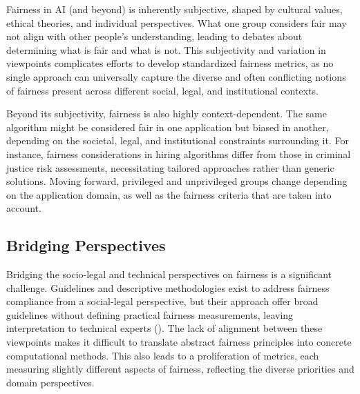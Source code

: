 \documentclass[12pt,a4paper,openright,twoside]{book}
\begin{document}


Fairness in \ac{AI} (and beyond) is inherently subjective, shaped by cultural values, ethical theories, and individual perspectives.
%
What one group considers fair may not align with other people’s understanding, leading to debates about determining what is fair and what is not.
%
This subjectivity and variation in viewpoints complicates efforts to develop standardized fairness metrics, as no single approach can universally capture the diverse and often conflicting notions of fairness present across different social, legal, and institutional contexts.


Beyond its subjectivity, fairness is also highly context-dependent. The same algorithm might be considered fair in one application but biased in another, depending on the societal, legal, and institutional constraints surrounding it.
%
For instance, fairness considerations in hiring algorithms differ from those in criminal justice risk assessments, necessitating tailored approaches rather than generic solutions.
%
Moving forward, privileged and unprivileged groups change depending on the application domain, as well as the fairness criteria that are taken into account.

\subsection{Bridging Perspectives}

Bridging the socio-legal and technical perspectives on fairness is a significant challenge. 
%
Guidelines and descriptive methodologies exist to address fairness compliance from a social-legal perspective, but their approach offer broad guidelines without defining practical fairness measurements, leaving interpretation to technical experts (\cite{hicssfairness2025}).
%
The lack of alignment between these viewpoints makes it difficult to translate abstract fairness principles into concrete computational methods.
%
This also leads to a proliferation of metrics, each measuring slightly different aspects of fairness, reflecting the diverse priorities and domain perspectives.
\end{document}
